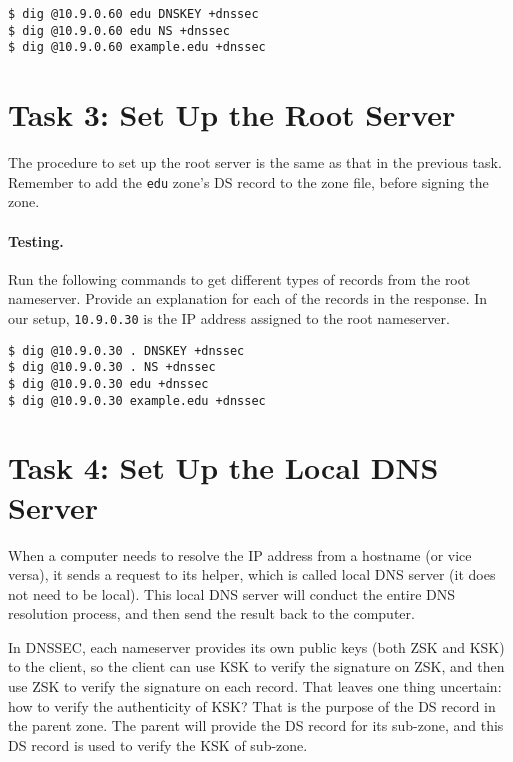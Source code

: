 \begin{lstlisting}
$ dig @10.9.0.60 edu DNSKEY +dnssec
$ dig @10.9.0.60 edu NS +dnssec
$ dig @10.9.0.60 example.edu +dnssec
\end{lstlisting}




\section{Task 3: Set Up the Root Server} 

The procedure to set up the root server is the same as that in the 
previous task. Remember to add the \texttt{edu} zone's DS record 
to the zone file, before signing the zone.  


\paragraph{Testing.}
Run the following commands to get different types of records
from the root nameserver. Provide an explanation
for each of the records in the response. In our setup,
\texttt{10.9.0.30} is the 
IP address assigned to the root nameserver.


\begin{lstlisting}
$ dig @10.9.0.30 . DNSKEY +dnssec
$ dig @10.9.0.30 . NS +dnssec
$ dig @10.9.0.30 edu +dnssec
$ dig @10.9.0.30 example.edu +dnssec
\end{lstlisting}




\section{Task 4: Set Up the Local DNS Server} 


When a computer needs to resolve the IP address from a hostname (or vice versa),
it sends a request to its helper, which is called local DNS server (it
does not need to be local).  This local DNS server will conduct the
entire DNS resolution process, and then send the result back to the computer.


In DNSSEC, each nameserver provides its own public keys (both ZSK and KSK) to
the client, so the client can use KSK to verify the signature on ZSK, and then use ZSK to 
verify the signature on each record. That leaves one thing uncertain: how to verify
the authenticity of KSK? That is the purpose of the DS record in the parent zone. 
The parent will provide the DS record for its sub-zone, and this DS record is used 
to verify the KSK of sub-zone. 

